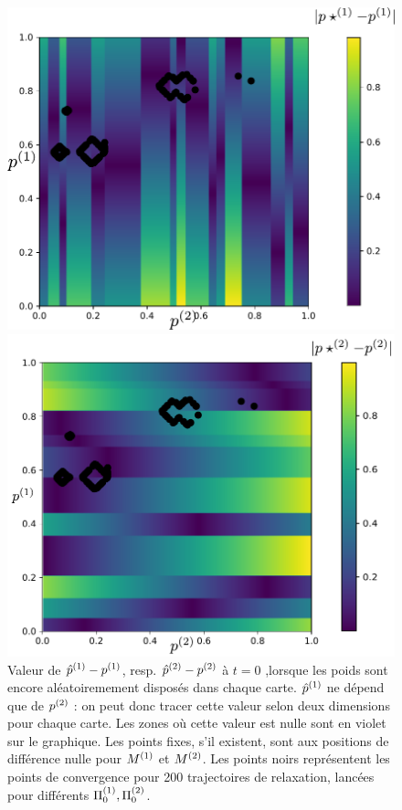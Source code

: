 \documentclass[../main]{subfiles}
\begin{document}
\begin{figure}
\begin{minipage}{0.5\textwidth}
\centering
\includegraphics[width=\textwidth]{champ_X_006_t1_notraj.pdf}
\end{minipage}
\begin{minipage}{0.5\textwidth}
\centering
\includegraphics[width=\textwidth]{champ_Y_006_t1_notraj.pdf}
\end{minipage}
\caption{Valeur de ${\hat{p}}^{({1})} - p^{({1})}$, resp. ${\hat{p}}^{({2})} - p^{({2})}$ à $t=0$ ,lorsque les poids sont encore aléatoiremement disposés dans chaque carte.
 ${\hat{p}}^{({1})}$ ne dépend que de $p^{({2})}$ : on peut donc tracer cette valeur selon deux dimensions pour chaque carte. Les zones où cette valeur est nulle sont en violet sur le graphique. Les points fixes, s'il existent, sont aux positions de différence nulle pour $M^{({1})}$ et $M^{({2})}$. Les points noirs représentent les points de convergence pour 200 trajectoires de relaxation, lancées pour différents $\Pi_0^{({1})}, \Pi_0^{({2})}$.}
 
\label{fig:diff_relax_t1_notraj}
\end{figure}
\end{document}

